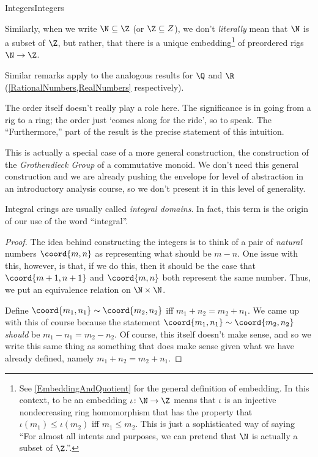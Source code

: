 \begin{thm}{Integers}{Integers}
\begin{rmk}
Similarly, when we write $\N \subseteq \Z$ (or $\Z \subseteq Z$), we don't \emph{literally} mean that $\N$ is a subset of $\Z$, but rather, that there is a unique embedding\footnote{See \cref{EmbeddingAndQuotient} for the general definition of embedding.  In this context, to be an embedding $\iota \colon \N \rightarrow \Z$ means that $\iota$ is an injective nondecreasing ring homomorphism that has the property that $\iota (m_1)\leq \iota (m_2)$ iff $m_1\leq m_2$.  This is just a sophisticated way of saying ``For almost all intents and purposes, we can pretend that $\N$ is actually a subset of $\Z$.''.} of preordered rigs $\N \rightarrow \Z$.

Similar remarks apply to the analogous results for $\Q$ and $\R$ (\cref{RationalNumbers,RealNumbers} respectively).
\end{rmk}
\begin{rmk}
The order itself doesn't really play a role here.  The significance is in going from a rig to a ring; the order just `comes along for the ride', so to speak.  The ``Furthermore,\textellipsis'' part of the result is the precise statement of this intuition.
\end{rmk}
\begin{rmk}
This is actually a special case of a more general construction, the construction of the \emph{Grothendieck Group} of a commutative monoid.  We don't need this general construction and we are already pushing the envelope for level of abstraction in an introductory analysis course, so we don't present it in this level of generality.
\end{rmk}
\begin{rmk}
Integral crings are usually called \emph{integral domains}.  In fact, this term is the origin of our use of the word ``integral''.
\end{rmk}
\begin{proof}
The idea behind constructing the integers is to think of a pair of \emph{natural} numbers $\coord{m,n}$ as representing what should be $m-n$.  One issue with this, however, is that, if we do this, then it should be the case that $\coord{m+1,n+1}$ and $\coord{m,n}$ both represent the same number.  Thus, we put an equivalence relation on $\N \times \N$.

Define $\coord{m_1,n_1}\sim \coord{m_2,n_2}$ iff $m_1+n_2=m_2+n_1$.  We came up with this of course because the statement $\coord{m_1,n_1}\sim \coord{m_2,n_2}$ \emph{should} be $m_1-n_1=m_2-n_2$.  Of course, this itself doesn't make sense, and so we write this same thing as something that does make sense given what we have already defined, namely $m_1+n_2=m_2+n_1$.


\end{proof}
\end{thm}

